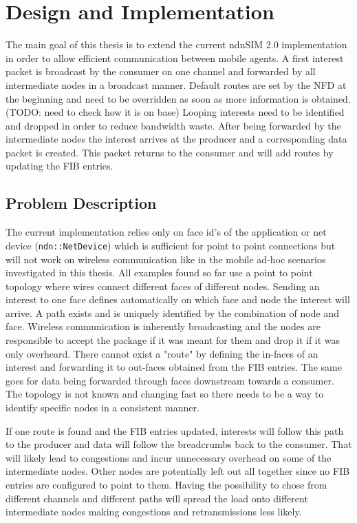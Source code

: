 \chapter{Design and Implementation}

The main goal of this thesis is to extend the current ndnSIM 2.0 implementation in order to allow efficient communication between mobile agents. A first interest packet is broadcast by the consumer on one channel and forwarded by all intermediate nodes in a broadcast manner. Default routes are set by the NFD at the beginning and need to be overridden as soon as more information is obtained. (TODO: need to check how it is on base) Looping interests need to be identified and dropped in order to reduce bandwidth waste. After being forwarded by the intermediate nodes the interest arrives at the producer and a corresponding data packet is created. This packet returns to the consumer and will add routes by updating the FIB entries.

\section{Problem Description}

The current implementation relies only on face id's of the application or net device (\texttt{ndn::NetDevice}) which is sufficient for point to point connections but will not work on wireless communication like in the mobile ad-hoc scenarios investigated in this thesis. All examples found so far use a point to point topology where wires connect different faces of different nodes. Sending an interest to one face defines automatically on which face and node the interest will arrive. A path exists and is uniquely identified by the combination of node and face. Wireless communication is inherently broadcasting and the nodes are responsible to accept the package if it was meant for them and drop it if it was only overheard. There cannot exist a "route" by defining the in-faces of an interest and forwarding it to out-faces obtained from the FIB entries. The same goes for data being forwarded through faces downstream towards a consumer. The topology is not known and changing fast so there needs to be a way to identify specific nodes in a consistent manner.

If one route is found and the FIB entries updated, interests will follow this path to the producer and data will follow the breadcrumbs back to the consumer. That will likely lead to congestions and incur unnecessary overhead on some of the intermediate nodes. Other nodes are potentially left out all together since no FIB entries are configured to point to them. Having the possibility to chose from different channels and different paths will spread the load onto different intermediate nodes making congestions and retransmissions less likely.

